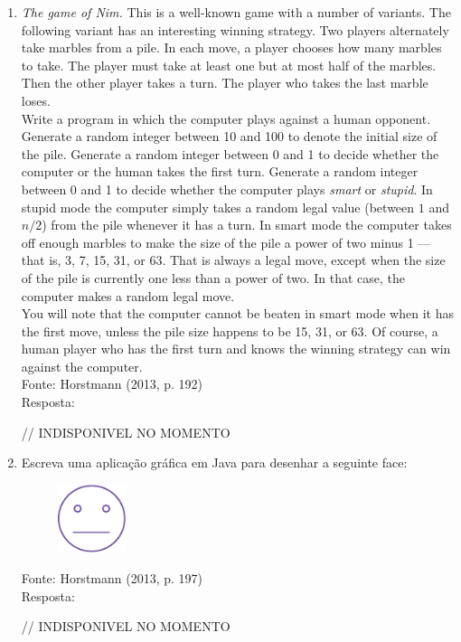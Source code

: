 \documentclass[onecolumn,a4paper,10pt]{report}
\newcommand{\+}{\, + \,}
\newcommand{\<}{\hspace*{-0.4cm}}
\begin{document}
\begin{enumerate}[1.]
\item \emph{The game of Nim.} This is a well-known game with a number of variants. The following variant has an interesting winning strategy. Two players alternately take
marbles from a pile. In each move, a player chooses how many marbles to take. The
player must take at least one but at most half of the marbles. Then the other player
takes a turn. The player who takes the last marble loses.\\
Write a program in which the computer plays against a human opponent. Generate a
random integer between 10 and 100 to denote the initial size of the pile. Generate a
random integer between 0 and 1 to decide whether the computer or the human takes
the first turn. Generate a random integer between 0 and 1 to decide whether the
computer plays \emph{smart} or \emph{stupid}. In stupid mode the computer simply takes a random
legal value (between $1$ and $n/2$) from the pile whenever it has a turn. In smart mode
the computer takes off enough marbles to make the size of the pile a power of two
minus 1 — that is, 3, 7, 15, 31, or 63. That is always a legal move, except when the size
of the pile is currently one less than a power of two. In that case, the computer makes a random legal move.\\
You will note that the computer cannot be beaten in smart mode when it has the first
move, unless the pile size happens to be 15, 31, or 63. Of course, a human player who
has the first turn and knows the winning strategy can win against the computer.\\
{\tiny Fonte: Horstmann (2013, p. 192)}\\
Resposta:\\
\begin{javacode}
// INDISPONIVEL NO MOMENTO
\end{javacode}

\item Escreva uma aplicação gráfica em Java para desenhar a seguinte face:
\begin{figure}[h]
	\includegraphics[height=2cm,center]{pucrs-ep-fprog-unidade_04-lacos-laminas-exercicio_1.png}
\end{figure}
{\tiny Fonte: Horstmann (2013, p. 197)}\\
Resposta:\\
\begin{javacode}
// INDISPONIVEL NO MOMENTO
\end{javacode}


\end{enumerate}
\end{document}
